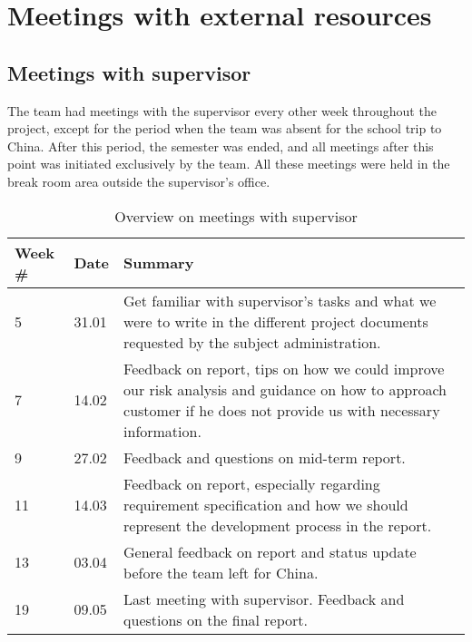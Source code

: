 \chapter{Meetings with external resources}

\section{Meetings with supervisor}
The team had meetings with the supervisor every other week throughout the project, except for the period when the team was absent for the school trip to China. After this period, the semester was ended, and all meetings after this point was initiated exclusively by the team. All these meetings were held in the break room area outside the supervisor's office.

\begin{table}[H]
\centering
\begin{tabular}{|l|l|p{12.6cm}|}
\hline
\textbf{Week \#} & \textbf{Date}&\textbf{Summary}\\\hline
5& 31.01&Get familiar with supervisor's tasks and what we were to write in the different project documents requested by the subject administration.\\\hline
7 &14.02&Feedback on report, tips on how we could improve our risk analysis and guidance on how to approach customer if he does not provide us with necessary information.\\\hline
9 &27.02& Feedback and questions on mid-term report.\\\hline
11 &14.03& Feedback on report, especially regarding requirement specification and how we should represent the development process in the report.\\\hline
13 &03.04&General feedback on report and status update before the team left for China.\\\hline
19&09.05& Last meeting with supervisor. Feedback and questions on the final report. \\\hline
\end{tabular}
\caption{Overview on meetings with supervisor}
\end{table}


